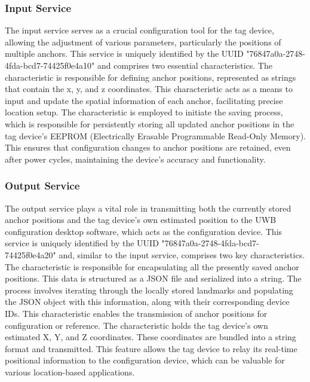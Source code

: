 \subsubsection{Input Service}
The input service serves as a crucial configuration tool for the tag device, allowing the adjustment of various parameters, particularly the positions of multiple anchors. This service is uniquely identified by the UUID "76847a0a-2748-4fda-bcd7-74425f0e4a10" and comprises two essential characteristics.
\vspace{4pt}
\newline
The  characteristic is responsible for defining anchor positions, represented as strings that contain the x, y, and z coordinates. This characteristic acts as a means to input and update the spatial information of each anchor, facilitating precise location setup.
\vspace{4pt}
\newline
The  characteristic is employed to initiate the saving process, which is responsible for persistently storing all updated anchor positions in the tag device's EEPROM (Electrically Erasable Programmable Read-Only Memory). This ensures that configuration changes to anchor positions are retained, even after power cycles, maintaining the device's accuracy and functionality.

\subsubsection{Output Service}
The output service plays a vital role in transmitting both the currently stored anchor positions and the tag device's own estimated position to the UWB configuration desktop software, which acts as the configuration device. This service is uniquely identified by the UUID "76847a0a-2748-4fda-bcd7-74425f0e4a20" and, similar to the input service, comprises two key characteristics.
\vspace{4pt}
\newline
The  characteristic is responsible for encapsulating all the presently saved anchor positions. This data is structured as a JSON file and serialized into a string. The process involves iterating through the locally stored landmarks and populating the JSON object with this information, along with their corresponding device IDs. This characteristic enables the transmission of anchor positions for configuration or reference.
\vspace{4pt}
\newline
The  characteristic holds the tag device's own estimated X, Y, and Z coordinates. These coordinates are bundled into a string format and transmitted. This feature allows the tag device to relay its real-time positional information to the configuration device, which can be valuable for various location-based applications.

